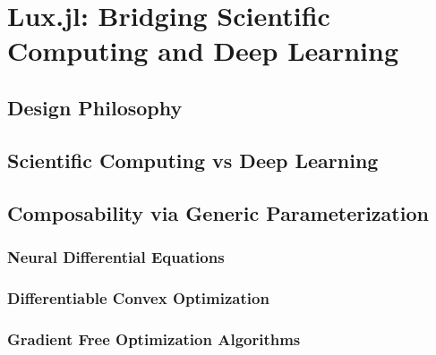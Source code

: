 \chapter{Lux.jl: Bridging Scientific Computing and Deep Learning}
\label{chapter:lux_bridging_scientific_computing_and_deep_learning}


\section{Design Philosophy}
\label{sec:design_philosophy}

\section{Scientific Computing vs Deep Learning}
\label{sec:scientific_computing_vs_deep_learning}

\section{Composability via Generic Parameterization}
\label{sec:composability}


\subsection{Neural Differential Equations}
\label{subsec:differential_equations_lux}


\subsection{Differentiable Convex Optimization}
\label{subsec:convex_optimization_lux}


\subsection{Gradient Free Optimization Algorithms}
\label{subsec:evolutionary_alg_lux}

